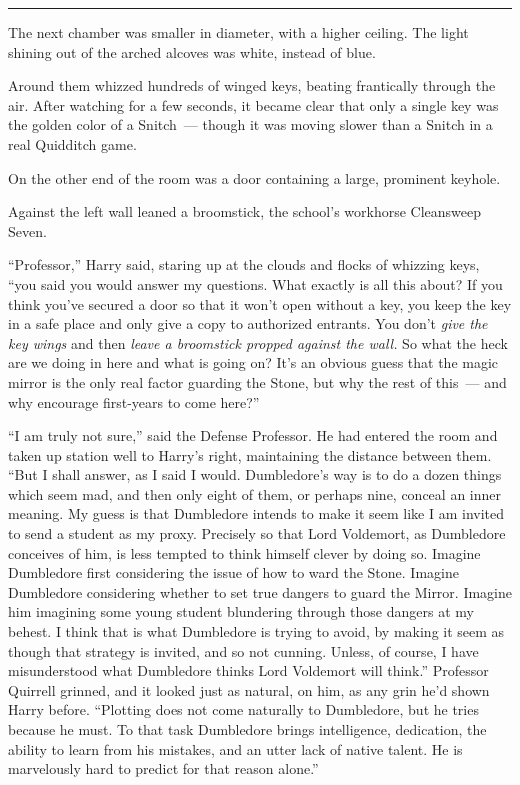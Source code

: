 \begin{center}\rule{3in}{0.4pt}\end{center}

The next chamber was smaller in diameter, with a higher ceiling. The light shining out of the arched alcoves was white, instead of blue.

Around them whizzed hundreds of winged keys, beating frantically through the air. After watching for a few seconds, it became clear that only a single key was the golden color of a Snitch~--- though it was moving slower than a Snitch in a real Quidditch game.

On the other end of the room was a door containing a large, prominent keyhole.

Against the left wall leaned a broomstick, the school's workhorse Cleansweep Seven.

``Professor,'' Harry said, staring up at the clouds and flocks of whizzing keys, ``you said you would answer my questions. What exactly is all this about? If you think you've secured a door so that it won't open without a key, you keep the key in a safe place and only give a copy to authorized entrants. You don't \emph{give the key wings} and then \emph{leave a broomstick propped against the wall.} So what the heck are we doing in here and what is going on? It's an obvious guess that the magic mirror is the only real factor guarding the Stone, but why the rest of this~--- and why encourage first-years to come here?''

``I am truly not sure,'' said the Defense Professor. He had entered the room and taken up station well to Harry's right, maintaining the distance between them. ``But I shall answer, as I said I would. Dumbledore's way is to do a dozen things which seem mad, and then only eight of them, or perhaps nine, conceal an inner meaning. My guess is that Dumbledore intends to make it seem like I am invited to send a student as my proxy. Precisely so that Lord Voldemort, as Dumbledore conceives of him, is less tempted to think himself clever by doing so. Imagine Dumbledore first considering the issue of how to ward the Stone. Imagine Dumbledore considering whether to set true dangers to guard the Mirror. Imagine him imagining some young student blundering through those dangers at my behest. I think that is what Dumbledore is trying to avoid, by making it seem as though that strategy is invited, and so not cunning. Unless, of course, I have misunderstood what Dumbledore thinks Lord Voldemort will think.'' Professor Quirrell grinned, and it looked just as natural, on him, as any grin he'd shown Harry before. ``Plotting does not come naturally to Dumbledore, but he tries because he must. To that task Dumbledore brings intelligence, dedication, the ability to learn from his mistakes, and an utter lack of native talent. He is marvelously hard to predict for that reason alone.''

